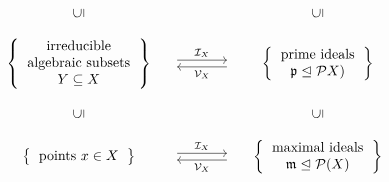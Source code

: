 \begin{theorem}
\begin{enumerate}
\[\begin{matrix}
          \\
            {}
          & {}
          & {}
          \\
            \rotatebox[origin=c]{90}{$\subseteq$}
          & {}
          & \rotatebox[origin=c]{90}{$\subseteq$}
          \\
            {}
          & {}
          & {}
          \\
            \left\{
              \begin{tabular}{c}
                  irreducible \\
                  algebraic subsets \\
                  $Y \subseteq X$
              \end{tabular}
            \right\}
          & \begin{tikzcd}[column sep = large]
                {}
                \arrow[shift left]{r}{\mc{I}_X}
              & {}
                \arrow[shift left]{l}{\mc{V}_X}
            \end{tikzcd}
          & \left\{
              \begin{tabular}{c}
                prime ideals \\
                $\mf{p} \idealeq \mc{P}X)$
              \end{tabular}
            \right\}
          \\
            {}
          & {}
          & {}
          \\
            \rotatebox[origin=c]{90}{$\subseteq$}
          & {}
          & \rotatebox[origin=c]{90}{$\subseteq$}
          \\
            {}
          & {}
          & {}
          \\
            \left\{
              \begin{tabular}{c}
                points $x \in X$
              \end{tabular}
            \right\}
          & \begin{tikzcd}[column sep = large]
                {}
                \arrow[shift left]{r}{\mc{I}_X}
              & {}
                \arrow[shift left]{l}{\mc{V}_X}
            \end{tikzcd}
          & \left\{
              \begin{tabular}{c}
                maximal ideals \\
                $\mf{m} \idealeq \mc{P}(X)$
              \end{tabular}
            \right\}
        \end{matrix}
      \]
  \end{enumerate}
\end{theorem}



